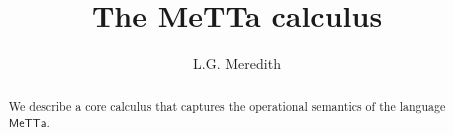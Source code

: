 \def\lastname{Meredith}

\title{The MeTTa calculus}

\author{ L.G. Meredith }

\maketitle              %


\begin{abstract}

  We describe a core calculus that captures the operational semantics
  of the language $\mathsf{MeTTa}$.

\end{abstract}



